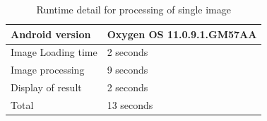 	\begin{table}[h]
		\begin{center}
			\begin{tabular}{ | l | p{3cm} |}
				\hline
				
				Android version & Oxygen OS 11.0.9.1.GM57AA \\ \hline
				Image Loading time & 2 seconds \\ \hline
				Image processing & 9 seconds \\ \hline
				Display of result & 2 seconds \\ \hline
				Total & 13 seconds \\ \hline
				\hline
			\end{tabular}
			\caption{Runtime detail for processing of single image}
			\label{table:android_spec}
		\end{center}
	\end{table}    
    


